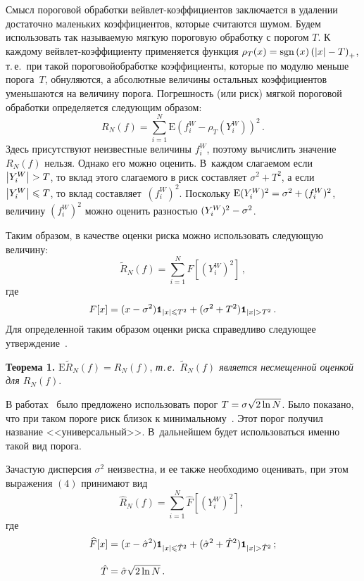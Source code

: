 \begin{multicols}{2}
Смысл пороговой обработки вейвлет-ко\-эф\-фи\-ци\-ен\-тов заключается в удалении достаточно 
маленьких коэффициентов, которые считаются шумом. Будем использовать так называемую 
\mbox{мягкую}\linebreak
 пороговую обработку с порогом $T$. К каждому вейв\-лет-ко\-эф\-фи\-ци\-ен\-ту применяется 
функция $\rho_T(x)\hm=\mathrm{sgn}\left(x\right)\left(\abs{x}\hm-T\right)_{+}$, т.\,е.\ 
при такой пороговой\linebreak обработке коэффициенты, которые по модулю меньше порога~$T$, 
обнуляются, а абсолютные величины остальных коэффициентов уменьшаются на величину порога.
Погрешность (или риск) мягкой пороговой обработки определяется следующим образом:
\begin{equation*}
R_N(f)=\sum\limits_{i=1}^{N}\mbox{E}\left(f^{W}_{i}-\rho_T(Y^W_i)\right)^2\,.
\end{equation*}
Здесь присутствуют неизвестные величины $f^{W}_{i}$, поэтому 
вычислить значение $R_N(f)$ нельзя. Однако его можно оценить. 
В~каждом слагаемом если $\abs{Y^W_i}\hm>T$, то вклад этого слагаемого в риск составляет 
$\sigma^2+T^2$, а если $\abs{Y^W_i}\hm\leqslant T$, то вклад составляет~$(f_i^W)^2$. 
Поскольку $\mbox{E}(Y_i^W)^2\hm=\sigma^2\hm+(f_i^W)^2$, величину $(f_i^W)^2$ можно 
оценить разностью $(Y_i^W)^2\hm-\sigma^2$.

Таким образом, в качестве оценки риска можно использовать следующую величину:
\begin{equation}
\widetilde{R}_N(f)=\sum\limits_{i=1}^{N}F[(Y_i^W)^2]\,,
\label{e4sh}
\end{equation}
где
\begin{equation*}
F[x]=(x-\sigma^2)\Ik_{|x|\leqslant T^2}+(\sigma^2+T^2)\Ik_{|x|>T^2}\,.
\end{equation*}
Для определенной таким образом оценки риска справедливо следующее утверждение~\cite{10sh}.

\medskip

\noindent
\textbf{Теорема 1.} $\mbox{E}\widetilde{R}_N(f)=R_N(f)$, \textit{т.\,е.\
$\widetilde{R}_N(f)$ является несмещенной оценкой для $R_N(f)$}.

\smallskip

В работах~\cite{2sh, 3sh} было предложено использовать порог 
$T\hm=\sigma\sqrt{2\ln N}$. Было показано, что при таком пороге риск близок к минимальному~\cite{2sh}.
Этот порог получил название <<универсальный>>. 
В~дальнейшем будет использоваться именно такой вид порога.

Зачастую дисперсия $\sigma^2$ неизвестна, и ее также необходимо оценивать, 
при этом выражения $(4)$ принимают вид
\begin{equation}
\widehat{R}_N(f)=\sum\limits_{i=1}^{N}\widehat{F}[(Y_i^W)^2],\;
\label{e5sh}
\end{equation}
где
\begin{align*}
\widehat{F}[x]&=(x-\hat{\sigma}^2)\Ik_{|x|\leqslant\hat{T}^2}+
(\hat{\sigma}^2+\hat{T}^2)\Ik_{|x|>\hat{T}^2}\,;\\[9pt]
\hat{T}&= \hat{\sigma}\sqrt{2\ln N}\,.
\end{align*}


\end{multicols}
